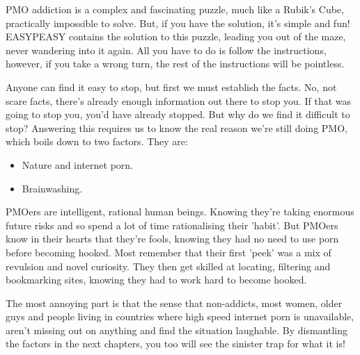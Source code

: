 \documentclass[easypeasy.tex]{subfiles}
\begin{document}
PMO addiction is a complex and fascinating puzzle, much like a Rubik's Cube, practically impossible to solve. But, if you have the solution, it's simple and fun! EASYPEASY contains the solution to this puzzle, leading you out of the maze, never wandering into it again. All you have to do is follow the instructions, however, if you take a wrong turn, the rest of the instructions will be pointless.

Anyone can find it easy to stop, but first we must establish the facts. No, not scare facts, there's already enough information out there to stop you. If that was going to stop you, you'd have already stopped. But why do we find it difficult to stop? Answering this requires us to know the real reason we're still doing PMO, which boils down to two factors. They are:
\begin{itemize}
  \item Nature and internet porn.
  \item Brainwashing.
\end{itemize}

PMOers are intelligent, rational human beings. Knowing they're taking enormous future risks and so spend a lot of time rationalising their 'habit'. But PMOers know in their hearts that they're fools, knowing they had no need to use porn before becoming hooked. Most remember that their first 'peek' was a mix of revulsion and novel curiosity. They then get skilled at locating, filtering and bookmarking sites, knowing they had to work hard to become hooked.

The most annoying part is that the sense that non-addicts, most women, older guys and people living in countries where high speed internet porn is unavailable, aren't missing out on anything and find the situation laughable. By dismantling the factors in the next chapters, you too will see the sinister trap for what it is!
\end{document}
